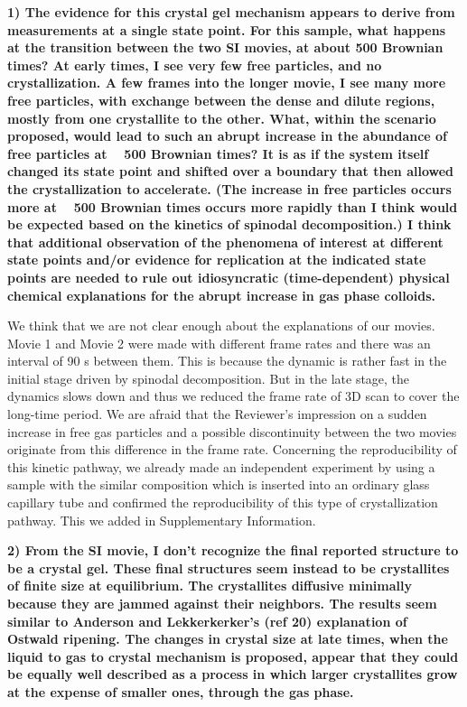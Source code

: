 \documentclass[11pt]{article}
\begin{document}
{\bf
1) The evidence for this crystal gel mechanism appears to derive from measurements at a single state point. For this sample, what happens at the transition between the two SI movies, at about 500 Brownian times? At early times, I see very few free particles, and no crystallization. A few frames into the longer movie, I see many more free particles, with exchange between the dense and dilute regions, mostly from one crystallite to the other. What, within the scenario proposed, would lead to such an abrupt increase in the abundance of free particles at ~ 500 Brownian times? It is as if the system itself changed its state point and shifted over a boundary that then allowed the crystallization to accelerate. (The increase in free particles occurs more at ~ 500 Brownian times occurs more rapidly than I think would be expected based on the kinetics of spinodal decomposition.) I think that additional observation of the phenomena of interest at different state points and/or evidence for replication at the indicated state points are needed to rule out idiosyncratic (time-dependent) physical chemical explanations for the abrupt increase in gas phase colloids.
}



\bigskip
\doublespacing


We think that we are not clear enough about the explanations of our movies. Movie 1 and Movie 2 were made with different frame rates and there was an interval of 90 s between them. This is because the dynamic is rather fast in the initial stage driven by spinodal decomposition. But in the late stage, the dynamics slows down and thus we reduced the frame rate of 3D scan to cover the long-time period. We are afraid that the Reviewer’s impression on a sudden increase in free gas particles and a possible discontinuity between the two movies originate from this difference in the frame rate. 
Concerning the reproducibility of this kinetic pathway, we already made an independent experiment by using a sample with the similar composition which is inserted into an ordinary glass capillary tube and confirmed the reproducibility of this type of crystallization pathway. This we added in Supplementary Information.


\vspace{1em}

\singlespacing

{\bf
2) From the SI movie, I don't recognize the final reported structure to be a crystal gel. These final structures seem instead to be crystallites of finite size at equilibrium. The crystallites diffusive minimally because they are jammed against their neighbors. The results seem similar to Anderson and Lekkerkerker's (ref 20) explanation of Ostwald ripening. The changes in crystal size at late times, when the liquid to gas to crystal mechanism is proposed, appear that they could be equally well described as a process in which larger crystallites grow at the expense of smaller ones, through the gas phase.

}
\end{document}

